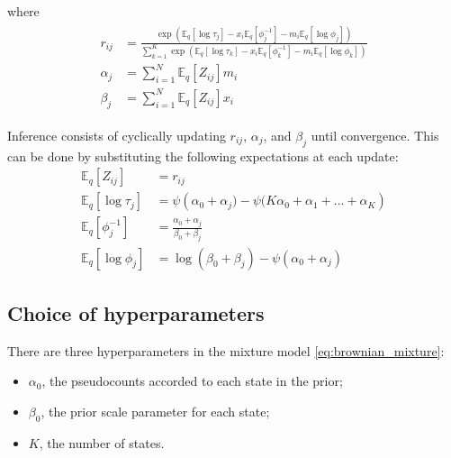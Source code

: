 \documentclass{article}
\begin{document}
where
\begin{align}\begin{split}
    r_{ij} &= \frac{
        \exp \left(
            \mathbb{E}_{q} \left[ \log \tau_{j} \right] - x_{i} \mathbb{E}_{q} \left[ \phi_{j}^{-1} \right] - m_{i} \mathbb{E}_{q} \left[ \log \phi_{j} \right]
        \right)
    }{
        \sum\limits_{k=1}^{K} \exp \left(
            \mathbb{E}_{q} \left[ \log \tau_{k} \right] - x_{i} \mathbb{E}_{q} \left[ \phi_{k}^{-1} \right] - m_{i} \mathbb{E}_{q} \left[ \log \phi_{k} \right]
        \right)
    } \\
    \alpha_{j} &= \sum\limits_{i=1}^{N} \mathbb{E}_{q} \left[ Z_{ij} \right] m_{i} \\
    \beta_{j} &= \sum\limits_{i=1}^{N} \mathbb{E}_{q} \left[ Z_{ij} \right] x_{i}
\end{split}\end{align}

Inference consists of cyclically updating $r_{ij}$, $\alpha_{j}$, and $\beta_{j}$
until convergence. This can be done by substituting the following expectations at each update:
\begin{align*}
    \mathbb{E}_{q} \left[ Z_{ij} \right] &= r_{ij} \\
    \mathbb{E}_{q} \left[ \log \tau_{j} \right] &= \psi \left( \alpha_{0} + \alpha_{j}) - \psi (K \alpha_{0} + \alpha_{1} + ... + \alpha_{K} \right) \\
    \mathbb{E}_{q} \left[ \phi_{j}^{-1} \right] &= \frac{\alpha_{0} + \alpha_{j}}{\beta_{0} + \beta_{j}} \\
    \mathbb{E}_{q} \left[ \log \phi_{j} \right] &= \log (\beta_{0} + \beta_{j}) - \psi (\alpha_{0} + \alpha_{j})
\end{align*}

\subsection{Choice of hyperparameters}

There are three hyperparameters in the mixture model \ref{eq:brownian_mixture}:
\begin{itemize}
    \item $\alpha_{0}$, the pseudocounts accorded to each state in the prior;
    \item $\beta_{0}$, the prior scale parameter for each state;
    \item $K$, the number of states.
\end{itemize}
\end{document}
